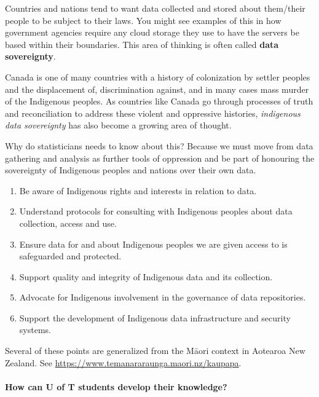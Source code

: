 \documentclass[
  openany]{book}
\providecommand{\tightlist}{%
  \setlength{\itemsep}{0pt}\setlength{\parskip}{0pt}}
\begin{document}
Countries and nations tend to want data collected and stored about them/their people to be subject to their laws. You might see examples of this in how government agencies require any cloud storage they use to have the servers be based within their boundaries. This area of thinking is often called \textbf{data sovereignty}.

Canada is one of many countries with a history of colonization by settler peoples and the displacement of, discrimination against, and in many cases mass murder of the Indigenous peoples. As countries like Canada go through processes of truth and reconciliation to address these violent and oppressive histories, \emph{indigenous data sovereignty} has also become a growing area of thought.

Why do statisticians needs to know about this? Because we must move from data gathering and analysis as further tools of oppression and be part of honouring the sovereignty of Indigenous peoples and nations over their own data.

\begin{enumerate}
\def\labelenumi{\arabic{enumi}.}
\tightlist
\item
  Be aware of Indigenous rights and interests in relation to data.
\item
  Understand protocols for consulting with Indigenous peoples about data collection, access and use.
\item
  Ensure data for and about Indigenous peoples we are given access to is safeguarded and protected.
\item
  Support quality and integrity of Indigenous data and its collection.
\item
  Advocate for Indigenous involvement in the governance of data repositories.
\item
  Support the development of Indigenous data infrastructure and security systems.
\end{enumerate}

Several of these points are generalized from the Māori context in Aotearoa New Zealand. See \url{https://www.temanararaunga.maori.nz/kaupapa}.

\hypertarget{how-can-u-of-t-students-develop-their-knowledge}{%
\paragraph{How can U of T students develop their knowledge?}\label{how-can-u-of-t-students-develop-their-knowledge}}
\end{document}
